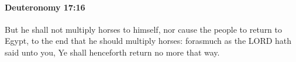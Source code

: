 
		\paragraph{Deuteronomy 17:16} %
			\label{DEUTERONOMY-17-16}

			But he shall not multiply horses to himself, nor cause the people to return to Egypt, to the end that he should multiply horses: forasmuch as the LORD hath said unto you, Ye shall henceforth return no more that way.


